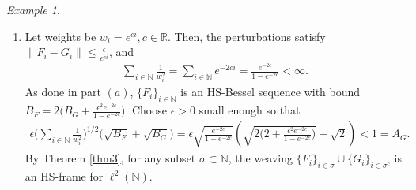\documentclass[reqno]{amsart}
\theoremstyle{plain}
\theoremstyle{remark}
\newtheorem{exa}[thm]{Example}
\numberwithin{equation}{section}
\begin{document}
\begin{exa}
\begin{enumerate}[$(a)$]
\begin{align*}
&=2\Big(B_G+\epsilon^2 \sum_{i \in  \mathbb{N}} \frac{1}{i^{2p}}\Big)\|x\|^2\\
&=2\big(B_G+\epsilon^2 \zeta(2p)\big)\|x\|^2,
\end{align*}
which shows that $\{F_i\}_{i \in \mathbb{N}}$ is an HS-Bessel sequence with bound $B_F=2\big(B_G+\epsilon^2 \zeta(2p)\big)$, here $\zeta(2p)$ is the Riemann zeta function at $2p$.
Choose $\epsilon > 0$ small enough to satisfy
\begin{align*}
\epsilon \Big(\sum_{i \in \mathbb{N}} \frac{1}{w_i^2}\Big)^{1/2}\big(\sqrt{B_F}+ \sqrt{B_G}\big)=\epsilon \sqrt{\zeta(2p)}\big(\sqrt{2\big(2+\epsilon^2 \zeta(2p)\big)}+ \sqrt{2}\big) < 1=A_G.
\end{align*}
By Theorem \ref{thm3}, for any subset $\sigma \subset \mathbb{N}$, the weaving $\{F_i\}_{i \in \sigma} \cup \{G_i\}_{i \in \sigma^c}$
is an HS-frame for $\ell^2(\mathbb{N})$.

\item Let weights be $w_i = e^{c i}, c \in \mathbb{R}$. Then, the perturbations satisfy $\|F_i - G_i\| \leq \frac{\epsilon}{e^{c i}}$,
and
\begin{align*}
\sum_{i \in \mathbb{N}} \frac{1}{w_i^2} = \sum_{i \in \mathbb{N}} e^{-2 c i} = \frac{e^{-2 c}}{1 - e^{-2 c}} < \infty.
\end{align*}
As done in part $(a)$, $\{F_i\}_{i \in \mathbb{N}}$ is an HS-Bessel sequence with bound $B_F=2\big(B_G+ \frac{\epsilon^2e^{-2 c}}{1 - e^{-2 c}} \big)$.
Choose $\epsilon > 0$ small enough so that
\begin{align*}
\epsilon \Big(\sum_{i \in \mathbb{N}} \frac{1}{w_i^2}\Big)^{1/2}\big(\sqrt{B_F}+ \sqrt{B_G}\big)=\epsilon \sqrt{\frac{e^{-2 c}}{1 - e^{-2 c}}}\left(\sqrt{2\Big(2+ \frac{\epsilon^2e^{-2 c}}{1 - e^{-2 c}}\Big)}+ \sqrt{2}\right) < 1=A_G.
\end{align*}
By Theorem \ref{thm3}, for any subset $\sigma \subset \mathbb{N}$, the weaving $\{F_i\}_{i \in \sigma} \cup \{G_i\}_{i \in \sigma^c}$ is an HS-frame for $\ell^2(\mathbb{N})$.
\end{enumerate}
\end{exa}
\end{document}
